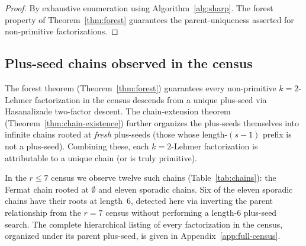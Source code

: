 \documentclass[11pt]{article}
\theoremstyle{definition}
\theoremstyle{remark}
\begin{document}
\begin{proof}
By exhaustive enumeration using Algorithm~\ref{alg:sharp}.  The forest
property of Theorem~\ref{thm:forest} guarantees the parent-uniqueness
asserted for non-primitive factorizations.
\end{proof}

\subsection{Plus-seed chains observed in the census}

The forest theorem (Theorem~\ref{thm:forest}) guarantees every
non-primitive $k = 2$-Lehmer factorization in the census descends from
a unique plus-seed via Hasanalizade two-factor descent.  The
chain-extension theorem (Theorem~\ref{thm:chain-existence}) further
organizes the plus-seeds themselves into infinite chains rooted at
\emph{fresh} plus-seeds (those whose length-$(s-1)$ prefix is not a
plus-seed).  Combining these, each $k = 2$-Lehmer factorization is
attributable to a unique chain (or is truly primitive).

In the $r \le 7$ census we observe twelve such chains
(Table~\ref{tab:chains}): the Fermat chain rooted at $\emptyset$ and
eleven sporadic chains.  Six of the eleven sporadic chains have their
roots at length~$6$, detected here via inverting the parent
relationship from the $r = 7$ census without performing a length-$6$
plus-seed search.  The complete hierarchical listing of every
factorization in the census, organized under its parent plus-seed,
is given in Appendix~\ref{app:full-census}.
\end{document}
